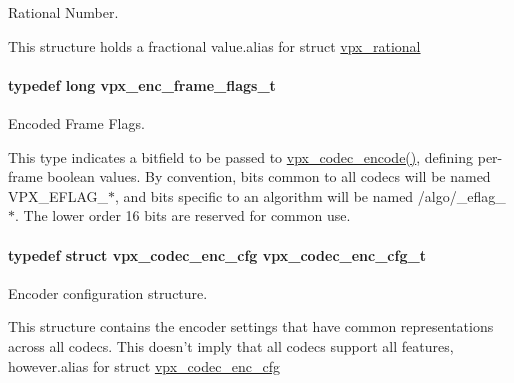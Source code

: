 Rational Number. 

This structure holds a fractional value.\-alias for struct \hyperlink{structvpx__rational}{vpx\-\_\-rational} \hypertarget{group__encoder_ga99e4a3c966f0de19fe1aa626bd860366}{
\paragraph[{vpx\-\_\-enc\-\_\-frame\-\_\-flags\-\_\-t}]{\setlength{\rightskip}{0pt plus 5cm}typedef long {\bf vpx\-\_\-enc\-\_\-frame\-\_\-flags\-\_\-t}}}\label{group__encoder_ga99e4a3c966f0de19fe1aa626bd860366}


Encoded Frame Flags. 

This type indicates a bitfield to be passed to \hyperlink{group__encoder_gaf990542e2aeb389f05fae3e9c7803639}{vpx\-\_\-codec\-\_\-encode()}, defining per-\/frame boolean values. By convention, bits common to all codecs will be named V\-P\-X\-\_\-\-E\-F\-L\-A\-G\-\_\-$\ast$, and bits specific to an algorithm will be named /algo/\-\_\-eflag\-\_\-$\ast$. The lower order 16 bits are reserved for common use. \hypertarget{group__encoder_ga946236c809e493b31a815d82db1e59db}{
\paragraph[{vpx\-\_\-codec\-\_\-enc\-\_\-cfg\-\_\-t}]{\setlength{\rightskip}{0pt plus 5cm}typedef struct {\bf vpx\-\_\-codec\-\_\-enc\-\_\-cfg}  {\bf vpx\-\_\-codec\-\_\-enc\-\_\-cfg\-\_\-t}}}\label{group__encoder_ga946236c809e493b31a815d82db1e59db}


Encoder configuration structure. 

This structure contains the encoder settings that have common representations across all codecs. This doesn't imply that all codecs support all features, however.\-alias for struct \hyperlink{structvpx__codec__enc__cfg}{vpx\-\_\-codec\-\_\-enc\-\_\-cfg} 

